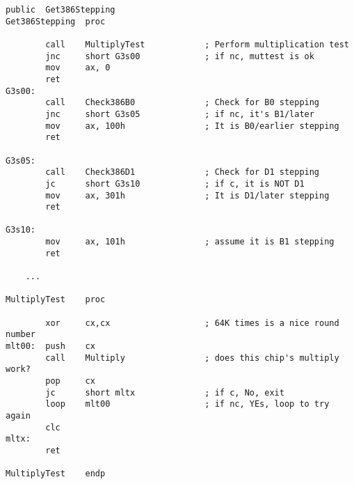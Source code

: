 \begin{lstlisting}[style=customasmx86]
        public  Get386Stepping
Get386Stepping  proc

        call    MultiplyTest            ; Perform multiplication test
        jnc     short G3s00             ; if nc, muttest is ok
        mov     ax, 0
        ret
G3s00:
        call    Check386B0              ; Check for B0 stepping
        jnc     short G3s05             ; if nc, it's B1/later
        mov     ax, 100h                ; It is B0/earlier stepping
        ret

G3s05:
        call    Check386D1              ; Check for D1 stepping
        jc      short G3s10             ; if c, it is NOT D1
        mov     ax, 301h                ; It is D1/later stepping
        ret

G3s10:
        mov     ax, 101h                ; assume it is B1 stepping
        ret

	...

MultiplyTest    proc

        xor     cx,cx                   ; 64K times is a nice round number
mlt00:  push    cx
        call    Multiply                ; does this chip's multiply work?
        pop     cx
        jc      short mltx              ; if c, No, exit
        loop    mlt00                   ; if nc, YEs, loop to try again
        clc
mltx:
        ret

MultiplyTest    endp
\end{lstlisting}

